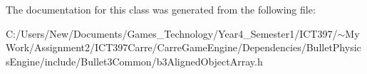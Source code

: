 The documentation for this class was generated from the following file:\begin{CompactItemize}
\item 
C:/Users/New/Documents/Games\_\-Technology/Year4\_\-Semester1/ICT397/$\sim$My Work/Assignment2/ICT397Carre/CarreGameEngine/Dependencies/BulletPhysicsEngine/include/Bullet3Common/b3AlignedObjectArray.h\end{CompactItemize}
